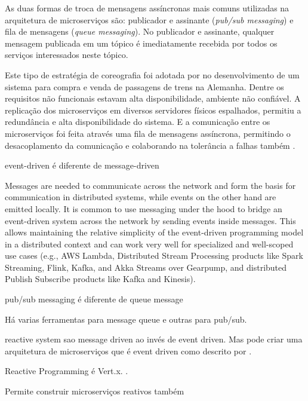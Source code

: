 \documentclass[12pt]{article}
\theoremstyle{plain}
\begin{document}
As duas formas de troca de mensagens assíncronas mais comuns utilizadas na arquitetura de microserviços são: publicador e assinante (\textit{pub/sub messaging}) e fila de mensagens (\textit{queue messaging}). No publicador e assinante, qualquer mensagem publicada em um tópico é imediatamente recebida por todos os serviços interessados neste tópico\cite{aws-pub-sub:2018}. 

Este tipo de estratégia de coreografia foi adotada por \cite{richter:2017} no desenvolvimento de um sistema para compra e venda de passagens de trens na Alemanha. Dentre os requisitos não funcionais estavam alta disponibilidade, ambiente não confiável. A replicação dos microserviços em diversos servidores físicos espalhados, permitiu a redundância e alta disponibilidade do sistema. E a comunicação entre os microserviços foi feita através uma fila de mensagens assíncrona, permitindo o desacoplamento da comunicação e colaborando na tolerância a falhas também \cite{richter:2017}.

event-driven é diferente de message-driven \cite{reactive-manifesto:2014, boner:2016}

Messages are needed to communicate across the network and form the basis for communication in distributed systems, while events on the other hand are emitted locally. It is common to use messaging under the hood to bridge an event-driven system across the network by sending events inside messages. This allows maintaining the relative simplicity of the event-driven programming model in a distributed context and can work very well for specialized and well-scoped use cases (e.g., AWS Lambda, Distributed Stream Processing products like Spark Streaming, Flink, Kafka, and Akka Streams over Gearpump, and distributed Publish Subscribe products like Kafka and Kinesis). \cite{boner:2016}

pub/sub messaging \cite{aws-pub-sub:2018} é diferente de queue message \cite{aws-message-queue:2018}

Há varias ferramentas para message queue e outras para pub/sub.



reactive system sao message driven ao invés de event driven. Mas pode criar uma arquitetura de microserviços que é event driven como descrito por \cite{damore:2018, boner:2016}.

Reactive Programming é Vert.x. \cite{boner:2016}. 

Permite construir microserviços reativos também \cite{Fetzer:2017, Brilhante:2017}
\end{document}
